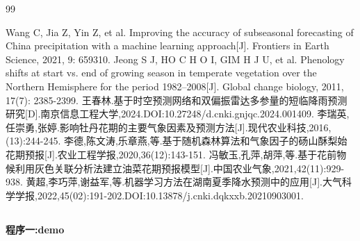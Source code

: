 \documentclass[withoutpreface,bwprint]{cumcmthesis} %
\begin{document}
\newpage
\begin{thebibliography}{99}
 Wang C, Jia Z, Yin Z, et al. Improving the accuracy of subseasonal forecasting of China precipitation with a machine learning approach[J]. Frontiers in Earth Science, 2021, 9: 659310.
 Jeong S J, HO C H O I, GIM H J U, et al. Phenology shifts at start vs. end of growing season in temperate vegetation over the Northern Hemisphere for the period 1982–2008[J]. Global change biology, 2011, 17(7): 2385-2399.
 王春林.基于时空预测网络和双偏振雷达多参量的短临降雨预测研究[D].南京信息工程大学,2024.DOI:10.27248/d.cnki.gnjqc.2024.001409.
李瑞英,任崇勇,张婷.影响牡丹花期的主要气象因素及预测方法[J].现代农业科技,2016,(13):244-245.
 李德,陈文涛,乐章燕,等.基于随机森林算法和气象因子的砀山酥梨始花期预报[J].农业工程学报,2020,36(12):143-151.
冯敏玉,孔萍,胡萍,等.基于花前物候利用灰色关联分析法建立油菜花期预报模型[J].中国农业气象,2021,42(11):929-938.
 黄超,李巧萍,谢益军,等.机器学习方法在湖南夏季降水预测中的应用[J].大气科学学报,2022,45(02):191-202.DOI:10.13878/j.cnki.dqkxxb.20210903001.
\end{thebibliography}

\newpage
\begin{appendices}

\section*{}

\textbf{\textcolor[rgb]{0.98,0.00,0.00}{程序一:demo}}

\end{appendices}
\end{document}
